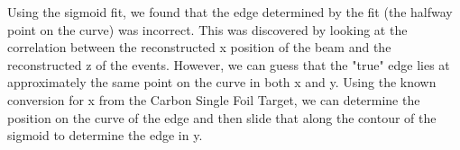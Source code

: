 Using the sigmoid fit, we found that the edge determined by the fit (the halfway point on the curve) was incorrect. This was discovered by looking at the correlation between the reconstructed x position of the beam and the reconstructed z of the events. However, we can guess that the "true" edge lies at approximately the same point on the curve in both x and y. Using the known conversion for x from the Carbon Single Foil Target, we can determine the position on the curve of the edge and then slide that along the contour of the sigmoid to determine the edge in y.